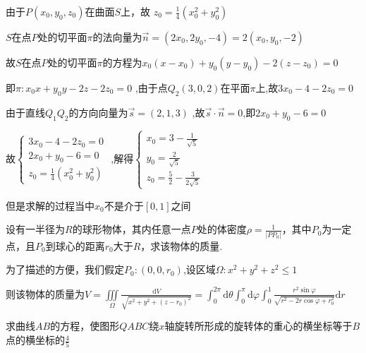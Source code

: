 \begin{xiti}
\begin{solution}
		由于$P\left(x_{0}, y_{0}, z_{0}\right)$在曲面$S$上，故
		$z_{0}= \frac{1}{4} (x_{0}^{2}+y_{0}^{2})$
		
		$S$在点$P$处的切平面$\pi$的法向量为$\vec{n} = (2x_{0},2y_{0},-4)=2(x_{0},y_{0},-2)$
		
		故$S$在点$P$处的切平面$\pi$的方程为$ x_{0} (x- x_{0}) + y_{0} (y- y_{0}) - 2 (z- z_{0}) = 0$
		
		即$\pi: x_{0} x + y_{0} y - 2 z - 2 z_{0} = 0$ ,由于点$Q_{2}(3,0,2)$在平面$\pi$上,故$ 3x_{0} - 4 - 2 z_{0} = 0 $
		
		由于直线$Q_{1} Q_{2} \text{的方向向量为} \vec{s} = (2,1,3)$ ,故$ \vec{s} \cdot \vec{n} = 0 $,即$ 2 x_{0} + y_{0} -6 =0 $
		
		故$\left\{ \begin{array} {l} {3x_{0} - 4 - 2 z_{0} = 0 } \\ {2 x_{0} + y_{0} -6 =0 } \\ {z_{0}= \frac{1}{4} (x_{0}^{2}+y_{0}^{2})} \end{array} \right.$
		,解得$\left\{ \begin{array} {l} {x_{0} = 3 - \frac{1}{\sqrt{5}} } \\ { y_{0} = \frac{2}{\sqrt{5}} } \\ {z_{0}= \frac{5}{2} - \frac{3}{ 2 \sqrt{5}}} \end{array} \right.$
		
		但是求解的过程当中$x_{0}$不是介于$[0,1]$之间
	\end{solution}
	
	\item 设有一半径为$R$的球形物体，其内任意一点$P$处的体密度$\rho=\frac{1}{\left|P P_{0}\right|}$，其中$P_{0}$为一定点，且$P_{0}$到球心的距离$r_{0}$大于$R$，求该物体的质量.
	\begin{solution}
		为了描述的方便，我们假定$P_{0}:(0,0,r_{0})$,设区域$\Omega: x^{2}+y^{2}+z^{2} \leqslant 1$
		
		则该物体的质量为$V = \iiint\limits_{\Omega} \frac{\mathrm{d} V }{ \sqrt{ x^{2} + y^{2} + (z-r_{0})^2 } } = \int_{0}^{2 \pi} \mathrm{d} \theta \int_{0}^{\pi} \mathrm{d} \varphi \int_{0}^{1} \frac{r^2 \sin \varphi}{ \sqrt{r^2 - 2r \cos \varphi + r_{0}^{2}} } \mathrm{d} r$
	\end{solution}
	
	\item 求曲线$AB$的方程，使图形$QABC$绕$x$轴旋转所形成的旋转体的重心的横坐标等于$B$点的横坐标的$\frac{4}{5}$
	\begin{solution}
	\end{solution}
	

\end{xiti}
